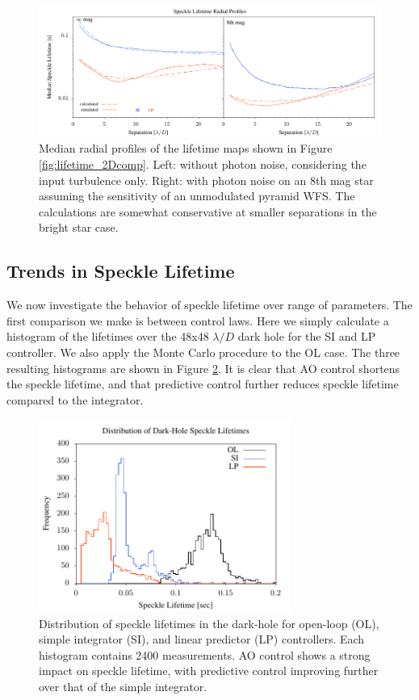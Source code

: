 \documentclass[10pt,preprint]{aastex631}
\begin{document}
\begin{figure}
\hspace{-0.3in}
\includegraphics[width=6.5in]{lifetimesRP.pdf}
\caption{Median radial profiles of the lifetime maps shown in Figure \ref{fig:lifetime_2Dcomp}.  Left: without photon noise, considering the input turbulence only.  Right: with photon noise on an 8th mag star assuming the sensitivity of an unmodulated pyramid WFS. The calculations are somewhat conservative at smaller separations in the bright star case.  \label{fig:lifetime_radprof}}
\end{figure}

\clearpage

\subsection{Trends in Speckle Lifetime}
\label{sec:trends}

We now investigate the behavior of speckle lifetime over range of parameters.  The first comparison we make is between control laws.  Here we simply calculate a histogram of the lifetimes over the 48x48 $\lambda/D$ dark hole for the SI and LP controller.  We also apply the Monte Carlo procedure to the OL case.  The three resulting histograms are shown in Figure \ref{fig:slHist}.  It is clear that AO control shortens the speckle lifetime, and that predictive control further reduces speckle lifetime compared to the integrator.

\begin{figure}[h]
\centering
\includegraphics[width=3.25in]{slHist.pdf}
\caption{Distribution of speckle lifetimes in the dark-hole for open-loop (OL), simple integrator (SI), and linear predictor (LP) controllers. Each histogram contains 2400 measurements.  AO control shows a strong impact on speckle lifetime, with predictive control improving further over that of the simple integrator. 
\label{fig:slHist}
}
\end{figure}
\end{document}

